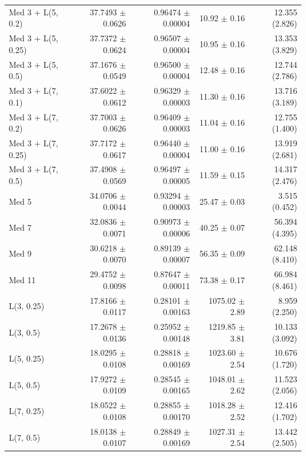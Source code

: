 \begin{longtable}{lrrrr}
Med 3 + L(5, 0.2) & 37.7493 $\pm$ 0.0626 & 0.96474 $\pm$ 0.00004 & 10.92 $\pm$ 0.16 & 12.355 (2.826) \\
Med 3 + L(5, 0.25) & 37.7372 $\pm$ 0.0624 & 0.96507 $\pm$ 0.00004 & 10.95 $\pm$ 0.16 & 13.353 (3.829) \\
Med 3 + L(5, 0.5) & 37.1676 $\pm$ 0.0549 & 0.96500 $\pm$ 0.00004 & 12.48 $\pm$ 0.16 & 12.744 (2.786) \\
Med 3 + L(7, 0.1) & 37.6022 $\pm$ 0.0612 & 0.96329 $\pm$ 0.00003 & 11.30 $\pm$ 0.16 & 13.716 (3.189) \\
Med 3 + L(7, 0.2) & 37.7003 $\pm$ 0.0626 & 0.96409 $\pm$ 0.00003 & 11.04 $\pm$ 0.16 & 12.755 (1.400) \\
Med 3 + L(7, 0.25) & 37.7172 $\pm$ 0.0617 & 0.96440 $\pm$ 0.00004 & 11.00 $\pm$ 0.16 & 13.919 (2.681) \\
Med 3 + L(7, 0.5) & 37.4908 $\pm$ 0.0569 & 0.96497 $\pm$ 0.00005 & 11.59 $\pm$ 0.15 & 14.317 (2.476) \\
Med 5 & 34.0706 $\pm$ 0.0044 & 0.93294 $\pm$ 0.00003 & 25.47 $\pm$ 0.03 & 3.515 (0.452) \\
Med 7 & 32.0836 $\pm$ 0.0071 & 0.90973 $\pm$ 0.00006 & 40.25 $\pm$ 0.07 & 56.394 (4.395) \\
Med 9 & 30.6218 $\pm$ 0.0070 & 0.89139 $\pm$ 0.00007 & 56.35 $\pm$ 0.09 & 62.148 (8.410) \\
Med 11 & 29.4752 $\pm$ 0.0098 & 0.87647 $\pm$ 0.00011 & 73.38 $\pm$ 0.17 & 66.984 (8.461) \\
L(3, 0.25) & 17.8166 $\pm$ 0.0117 & 0.28101 $\pm$ 0.00163 & 1075.02 $\pm$ 2.89 & 8.959 (2.250) \\
L(3, 0.5) & 17.2678 $\pm$ 0.0136 & 0.25952 $\pm$ 0.00148 & 1219.85 $\pm$ 3.81 & 10.133 (3.092) \\
L(5, 0.25) & 18.0295 $\pm$ 0.0108 & 0.28818 $\pm$ 0.00169 & 1023.60 $\pm$ 2.54 & 10.676 (1.720) \\
L(5, 0.5) & 17.9272 $\pm$ 0.0109 & 0.28545 $\pm$ 0.00165 & 1048.01 $\pm$ 2.62 & 11.523 (2.056) \\
L(7, 0.25) & 18.0522 $\pm$ 0.0108 & 0.28855 $\pm$ 0.00170 & 1018.28 $\pm$ 2.52 & 12.416 (1.702) \\
L(7, 0.5) & 18.0138 $\pm$ 0.0107 & 0.28849 $\pm$ 0.00169 & 1027.31 $\pm$ 2.54 & 13.442 (2.505) \\
\end{longtable}
\endgroup
